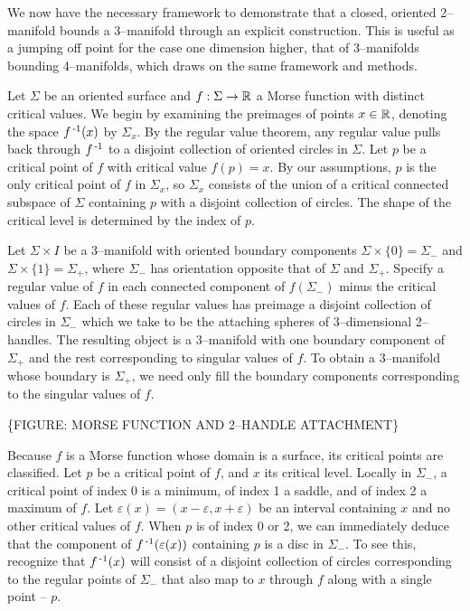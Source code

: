 \label{sec:2bound3}

We now have the necessary framework to demonstrate that a closed, oriented 2--manifold bounds a 3--manifold through an explicit construction.
This is useful as a jumping off point for the case one dimension higher, that of 3--manifolds bounding 4--manifolds, which draws on the same framework and methods.

Let $\Sigma$ be an oriented surface and $f:\Sigma\to\mathbb{R}$ a Morse function with distinct critical values.
We begin by examining the preimages of points $x\in\mathbb{R}$, denoting the space $f^{\,\text{-}1}(x)$ by $\Sigma_x$.
By the regular value theorem, any regular value pulls back through $f^{\,\text{-}1}$ to a disjoint collection of oriented circles in $\Sigma$.
Let $p$ be a critical point of $f$ with critical value $f(p)=x$.
By our assumptions, $p$ is the only critical point of $f$ in $\Sigma_x$, so $\Sigma_x$ consists of the union of a critical connected subspace of $\Sigma$ containing $p$ with a disjoint collection of circles.
The shape of the critical level is determined by the index of $p$.

Let $\Sigma\times I$ be a 3--manifold with oriented boundary components $\Sigma\times\{0\}=\Sigma_-$ and $\Sigma\times\{1\}=\Sigma_+$, where $\Sigma_-$ has orientation opposite that of $\Sigma$ and $\Sigma_+$.
Specify a regular value of $f$ in each connected component of $f(\Sigma_-)$ minus the critical values of $f$.
Each of these regular values has preimage a disjoint collection of circles in $\Sigma_-$ which we take to be the attaching spheres of 3--dimensional 2--handles. 
The resulting object is a 3--manifold with one boundary component of $\Sigma_+$ and the rest corresponding to singular values of $f$.
To obtain a 3--manifold whose boundary is $\Sigma_+$, we need only fill the boundary components corresponding to the singular values of $f$.

\{FIGURE: MORSE FUNCTION AND 2--HANDLE ATTACHMENT\}

Because $f$ is a Morse function whose domain is a surface, its critical points are classified.
Let $p$ be a critical point of $f$, and $x$ its critical level.
Locally in $\Sigma_-$, a critical point of index 0 is a minimum, of index 1 a saddle, and of index 2 a maximum of $f$.
Let $\varepsilon(x)=(x-\varepsilon,x+\varepsilon)$ be an interval containing $x$ and no other critical values of $f$.
When $p$ is of index 0 or 2, we can immediately deduce that the component of $f^{\,\text{-}1}(\varepsilon(x))$ containing $p$ is a disc in $\Sigma_-$.
To see this, recognize that $f^{\,\text{-}1}(x)$ will consist of a disjoint collection of circles corresponding to the regular points of $\Sigma_-$ that also map to $x$ through $f$ along with a single point -- $p$.

